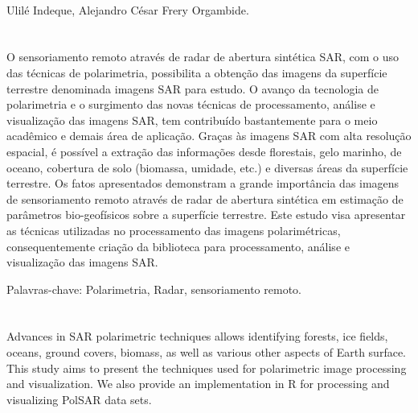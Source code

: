 \documentclass[a4paper,12pt]{article}
\begin{document}
\newpage
\justify
\textbf{\large{}}
\textbf{}\\

Ulilé Indeque, Alejandro César Frery Orgambide.

\section*{}
O sensoriamento remoto através de radar de abertura sintética SAR, com o uso das técnicas de polarimetria, possibilita a obtenção das imagens da superfície terrestre denominada imagens SAR para estudo.
O avanço da tecnologia de polarimetria e o surgimento das novas técnicas de processamento, análise e visualização das imagens SAR, tem contribuído bastantemente para o meio acadêmico e demais área de aplicação.
Graças às imagens SAR com alta resolução espacial, é possível a extração das informações desde florestais, gelo marinho, de oceano, cobertura de solo (biomassa, umidade, etc.) e diversas áreas da superfície terrestre.
Os fatos apresentados demonstram a grande importância das imagens de sensoriamento remoto através de radar de abertura sintética em estimação de parâmetros bio-geofísicos sobre a superfície terrestre. Este estudo visa apresentar as técnicas utilizadas no processamento das imagens polarimétricas, consequentemente criação da biblioteca para processamento, análise e visualização das imagens SAR.\newline



Palavras-chave: Polarimetria, Radar, sensoriamento remoto.\newline

\section*{}
Advances in SAR polarimetric techniques allows identifying forests, ice fields, oceans, ground covers, biomass, as well as various other aspects of Earth surface. This study aims to present the techniques used for polarimetric image processing and visualization. We also provide an implementation in R for processing and visualizing PolSAR data sets.\\
\end{document}

